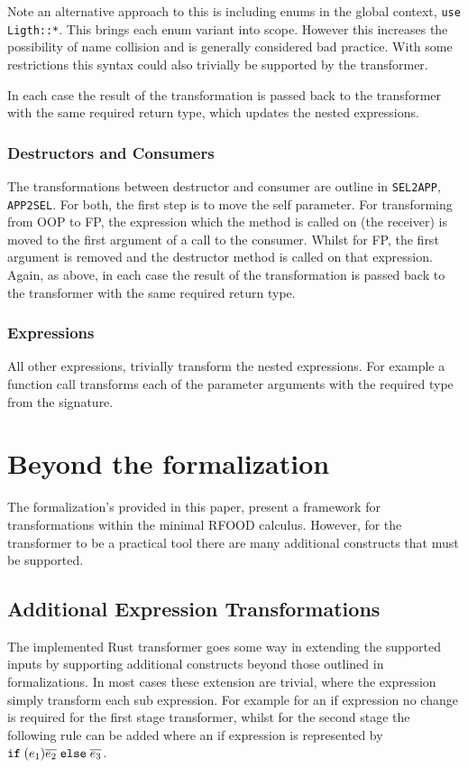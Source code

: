 \documentclass[ oneside,%
                    author={James Elgar},
                    degree={MEng},
                     title={Bidirectional transformer between functional and \\ object-oriented programming in Rust},
                  subtitle={}]{dissertation}
\newcommand{\rust}[1]{\texttt{#1}}
\begin{document}
Note an alternative approach to this is including enums in the global context, \rust{use Ligth::*}. This brings each enum variant into scope. However this increases the possibility of name collision and is generally considered bad practice. With some restrictions this syntax could also trivially be supported by the transformer.

In each case the result of the transformation is passed back to the transformer with the same required return type, which updates the nested expressions. 
\subsubsection{Destructors and Consumers}

The transformations between destructor and consumer are outline in \verb|SEL2APP|, \verb|APP2SEL|. For both, the first step is to move the self parameter. For transforming from OOP to FP, the expression which the method is called on (the receiver) is moved to the first argument of a call to the consumer. Whilst for FP, the first argument is removed and the destructor method is called on that expression. Again, as above, in each case the result of the transformation is passed back to the transformer with the same required return type.

\subsubsection{Expressions}

All other expressions, trivially transform the nested expressions. For example a function call transforms each of the parameter arguments with the required type from the signature.

\section{Beyond the formalization}

The formalization's provided in this paper, present a framework for transformations within the minimal RFOOD calculus. However, for the transformer to be a practical tool there are many additional constructs that must be supported.

\subsection{Additional Expression Transformations}

The implemented Rust transformer goes some way in extending the supported inputs by supporting additional constructs beyond those outlined in formalizations. In most cases these extension are trivial, where the expression simply transform each sub expression. For example for an if expression no change is required for the first stage transformer, whilst for the second stage the following rule can be added where an if expression is represented by $\texttt{if} \; (e_1) \overline{e_2} \;\texttt{else} \; \overline{e_3}$. 
\end{document}
